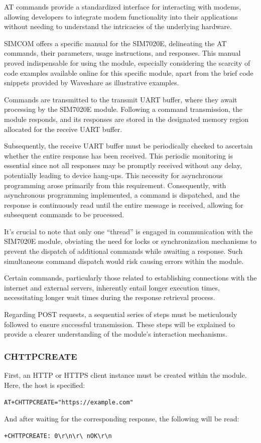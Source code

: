 AT commands provide a standardized interface for interacting with modems, allowing developers to 
integrate modem functionality into their applications without needing to understand the intricacies 
of the underlying hardware.

SIMCOM offers a specific manual for the SIM7020E, delineating the AT commands, their parameters, 
usage instructions, and responses. This manual proved indispensable for using the module, 
especially considering the scarcity of code examples available online for this specific module, 
apart from the brief code snippets provided by Waveshare as illustrative examples.

Commands are transmitted to the transmit UART buffer, where they await processing by the SIM7020E 
module. Following a command transmission, the module responds, and its responses are stored in the 
designated memory region allocated for the receive UART buffer.

Subsequently, the receive UART buffer must be periodically checked to ascertain whether the entire 
response has been received. This periodic monitoring is essential since not all responses may be 
promptly received without any delay, potentially leading to device hang-ups. This necessity for 
asynchronous programming arose primarily from this requirement. Consequently, with asynchronous 
programming implemented, a command is dispatched, and the response is continuously read until the 
entire message is received, allowing for subsequent commands to be processed.

It's crucial to note that only one ``thread'' is engaged in communication with the SIM7020E module, 
obviating the need for locks or synchronization mechanisms to prevent the dispatch of additional 
commands while awaiting a response. Such simultaneous command dispatch would risk causing errors 
within the module.

Certain commands, particularly those related to establishing connections with the internet and 
external servers, inherently entail longer execution times, necessitating longer wait times during 
the response retrieval process.

Regarding POST requests, a sequential series of steps must be meticulously followed to ensure 
successful transmission. These steps will be explained to provide a clearer understanding of the 
module's interaction mechanisms.

\subsubsection*{CHTTPCREATE}
First, an HTTP or HTTPS client instance must be created within the module. Here, the host is 
specified:
\begin{center}
	\texttt{AT+CHTTPCREATE="https://example.com"}
\end{center}
And after waiting for the corresponding response, the following will be read:
\begin{center}
	\texttt{+CHTTPCREATE: 0\textbackslash r\textbackslash n\textbackslash r\textbackslash
	nOK\textbackslash r\textbackslash n}
\end{center}

